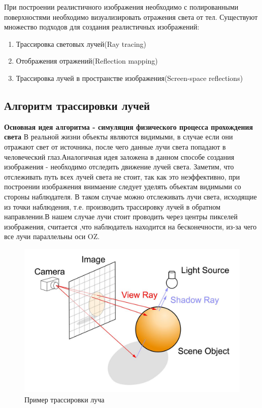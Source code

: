 \documentclass[a4paper,14pt, unknownkeysallowed]{extreport}
\begin{document}
При построении реалистичного изображения необходимо с полированными поверхностями необходимо визуализировать отражения света от тел.
Существуют множество подходов для создания реалистичных изображений:
\begin{enumerate}
	\item Трассировка световых лучей(Ray tracing)
	\item Отображения отражений(Reflection mapping)
	\item Трассировка лучей в пространстве изображения(Screen-space reflections)
\end{enumerate}





\subsection{Алгоритм трассировки лучей}
\textbf{Основная идея алгоритма - симуляция физического процесса прохождения света} \newline
В реальной жизни объекты являются видимыми, в случае если они отражают свет от источника, после чего данные лучи света попадают в человеческий глаз.Аналогичная идея заложена в данном способе создания изображения - необходимо отследить движение лучей света.
Заметим, что отслеживать путь всех лучей света не стоит, так как это неэффективно, при построении изображения внимаение следует уделять объектам видимыми со стороны наблюдателя.
В таком случае можно отслеживать лучи света, исходящие из точки наблюдения, т.е. производить трассировку лучей в обратном направлении.В нашем случае лучи стоит проводить через центры пикселей изображения,
считается ,что наблюдатель находится на бесконечности, из-за чего все лучи параллельны оси OZ.\cite{Rodgers}

\begin{figure}[h]
	\centering
	\includegraphics[scale=0.4]{ray_tracing.jpg}
	\caption{Пример трассировки луча}
	\label{fig:alg_ray_tracing}
\end{figure} 
\end{document}
